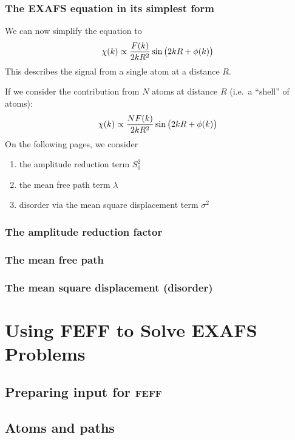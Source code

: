 \documentclass[10pt, xcolor=x11names, compress]{beamer}
\begin{document}
\begin{frame}
  \frametitle{The EXAFS equation in its simplest form}
  We can now simplify the equation to
  \begin{equation}
    \chi(k) \propto \frac{F(k)}{2kR^2}\sin\big(2kR+\phi(k)\big)
    \notag
  \end{equation}
  This describes the signal from a single atom at a distance $R$.

  \medskip

  If we consider the contribution from $N$ atoms at distance $R$
  (i.e.\ a ``shell'' of atoms):
  \begin{equation}
    \chi(k) \propto \frac{NF(k)}{2kR^2}\sin\big(2kR+\phi(k)\big)
    \notag
  \end{equation}
  On the following pages, we consider
  \begin{enumerate}
  \item the amplitude reduction term $S_0^2$
  \item the mean free path term $\lambda$
  \item disorder via the mean square displacement term $\sigma^2$
  \end{enumerate}
\end{frame}

\begin{frame}
  \frametitle{The amplitude reduction factor}
  
\end{frame}

\begin{frame}
  \frametitle{The mean free path}
  
\end{frame}

\begin{frame}
  \frametitle{The mean square displacement (disorder)}
  
\end{frame}

\section[EXAFS]{Using FEFF to Solve EXAFS Problems}
\subsection[\textsc{feff} input]{Preparing input for \textsc{feff}}

\subsection[Atoms and paths]{Atoms and paths}

\end{document}
